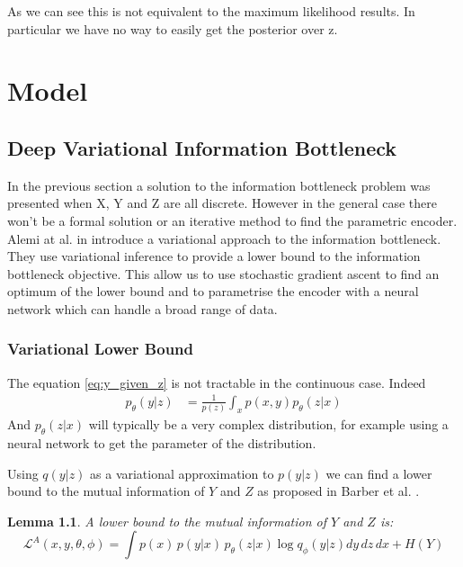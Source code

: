 \documentclass[10pt,oneside,openright]{report}
\newtheorem{lemma}{Lemma}
\begin{document}
As we can see this is not equivalent to the maximum likelihood results. In particular we have no way to easily get the posterior over z. 

\chapter{Model}
\section{Deep Variational Information Bottleneck}

In the previous section a solution to the information bottleneck problem was presented when X, Y and Z are all discrete. However in the general case there won't be a formal solution or an iterative method to find the parametric encoder. Alemi at al. in \cite{vib} introduce a variational approach to the information bottleneck. They use variational inference to provide a lower bound to the information bottleneck objective. This allow us to use stochastic gradient ascent to find an optimum of the lower bound and to parametrise the encoder with a neural network which can handle a broad range of data.

\subsection{Variational Lower Bound}

The equation \ref{eq:y_given_z} is not tractable in the continuous case. Indeed
\begin{align}
p_\theta(y|z) &= \frac{1}{p(z)} \int_x p(x, y) p_\theta(z|x) 
\end{align}
And $p_\theta(z|x)$ will typically be a very complex distribution, for example using a neural network to get the parameter of the distribution.

Using $q(y|z)$ as a variational approximation to $p(y|z)$ we can find a lower bound to the mutual information of $Y$ and $Z$ as proposed in Barber et al. \cite{barber}.

\begin{lemma}
A lower bound to the mutual information of $Y$ and $Z$ is:
$$ \mathcal{L}^{A}(x, y, \theta, \phi) = \int p(x)\, p(y|x)\, p_\theta(z|x) \log q_\phi(y|z) dy\, dz\, dx + H(Y)$$
\end{lemma}
\end{document}
